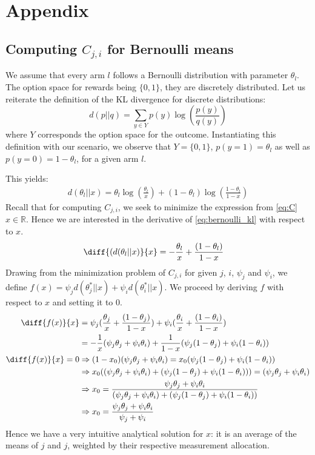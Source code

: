 \chapter{Appendix}

\section{Computing $C_{j, i}$ for Bernoulli means}\label{section:bernoulli_c}

We assume that every arm $l$ follows a Bernoulli distribution with parameter $\theta_l$. The option space for rewards being $\{0, 1\}$, they are discretely distributed. Let us reiterate the definition of the KL divergence for discrete distributions:
\[d(p || q) = \sum_{y \in Y}p(y) \log(\frac{p(y)}{q(y)})\]
where $Y$ corresponds the option space for the outcome.
Instantiating this definition with our scenario, we observe that $Y=\{0, 1\}$, $p(y=1)=\theta_l$  as well as $p(y=0)=1-\theta_l$, for a given arm $l$.

This yields:
\begin{align}
  d(\theta_l||x) = \theta_l \log(\frac{\theta_l}{x}) + (1-\theta_l) \log(\frac{1-\theta_l}{1-x}) \label{eq:bernoulli_kl}
\end{align}
Recall that for computing $C_{j, i}$, we seek to minimize the expression from \eqref{eq:C} $x \in \mathbb{R}$. Hence we are interested in the derivative of \eqref{eq:bernoulli_kl} with respect to $x$.
\begin{align}
  \diff{(d(\theta_l||x)}{x} &= - \frac{\theta_l}{x} + \frac{(1-\theta_l)}{1-x}
\end{align}
Drawing from the minimization problem of $C_{j,i}$ for given $j$, $i$, $\psi_j$ and $\psi_i$, we define $f(x) = \psi_j d(\theta^*_{j} || x) + \psi_i d(\theta_{i}^* ||x)$. We proceed by deriving $f$ with respect to $x$ and setting it to 0.
\begin{align}
  \diff{f(x)}{x} &= \psi_j(\frac{\theta_j}{x} + \frac{(1-\theta_j)}{1-x}) + \psi_i( \frac{\theta_i}{x} + \frac{(1-\theta_i)}{1-x}) \\
  &= -\frac{1}{x}(\psi_j\theta_j + \psi_i\theta_i) + \frac{1}{1-x}(\psi_j(1 - \theta_j) + \psi_i(1 - \theta_i)) \\
  \diff{f(x)}{x} = 0 &\Rightarrow (1-x_0)(\psi_j\theta_j + \psi_i\theta_i) = x_0(\psi_j(1 - \theta_j) + \psi_i(1 - \theta_i))\\
  &\Rightarrow x_0((\psi_j\theta_j + \psi_i\theta_i) + (\psi_j(1 - \theta_j) + \psi_i(1 - \theta_i))) = (\psi_j\theta_j + \psi_i\theta_i)\\
  &\Rightarrow x_0 = \frac{\psi_j\theta_j + \psi_i\theta_i}{(\psi_j\theta_j + \psi_i\theta_i) + (\psi_j(1 - \theta_j) + \psi_i(1 - \theta_i))} \\
  &\Rightarrow x_0 = \frac{\psi_j\theta_j + \psi_i\theta_i}{\psi_j + \psi_i}
\end{align}
Hence we have a very intuitive analytical solution for $x$: it is an average of the means of $j$ and $j$, weighted by their respective measurement allocation.

